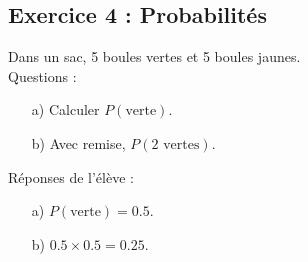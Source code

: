 \documentclass{article}
\begin{document}
\subsection*{Exercice 4 : Probabilités}
Dans un sac, 5 boules vertes et 5 boules jaunes. \\
Questions :
\begin{enumerate}
    \item[a)] Calculer $P(\text{verte})$.
    \item[b)] Avec remise, $P(2 \text{ vertes})$.
\end{enumerate}

Réponses de l’élève :
\begin{enumerate}
    \item[a)] $P(\text{verte}) = 0.5$.
    \item[b)] $0.5 \times 0.5 = 0.25$.
\end{enumerate}
\end{document}
